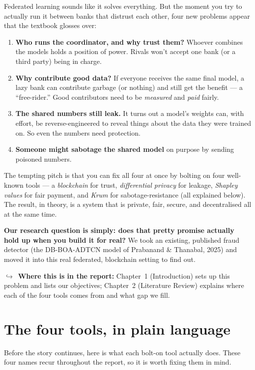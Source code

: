 \documentclass[11pt]{article}
\newcommand{\reportnote}[1]{%
  \par\vspace{3pt}%
  {\small\color{soft}$\hookrightarrow$\ \textbf{Where this is in the report:} #1}\par\vspace{2pt}}
\begin{document}
Federated learning sounds like it solves everything. But the moment you try to actually run it between
banks that distrust each other, four new problems appear that the textbook glosses over:

\begin{enumerate}
  \item \textbf{Who runs the coordinator, and why trust them?} Whoever combines the models holds a
  position of power. Rivals won't accept one bank (or a third party) being in charge.
  \item \textbf{Why contribute good data?} If everyone receives the same final model, a lazy bank can
  contribute garbage (or nothing) and still get the benefit --- a ``free-rider.'' Good contributors
  need to be \emph{measured} and \emph{paid} fairly.
  \item \textbf{The shared numbers still leak.} It turns out a model's weights can, with effort, be
  reverse-engineered to reveal things about the data they were trained on. So even the numbers need
  protection.
  \item \textbf{Someone might sabotage the shared model} on purpose by sending poisoned numbers.
\end{enumerate}

The tempting pitch is that you can fix all four at once by bolting on four well-known tools ---
a \emph{blockchain} for trust, \emph{differential privacy} for leakage, \emph{Shapley values} for fair
payment, and \emph{Krum} for sabotage-resistance (all explained below). The result, in theory, is a
system that is private, fair, secure, and decentralised all at the same time.

\textbf{Our research question is simply: does that pretty promise actually hold up when you build it for
real?} We took an existing, published fraud detector (the DB-BOA-ADTCN model of Prabanand \& Thanabal,
2025) and moved it into this real federated, blockchain setting to find out.

\reportnote{Chapter~1 (Introduction) sets up this problem and lists our objectives; Chapter~2
(Literature Review) explains where each of the four tools comes from and what gap we fill.}

\section{The four tools, in plain language}

Before the story continues, here is what each bolt-on tool actually does. These four names recur
throughout the report, so it is worth fixing them in mind.
\end{document}
